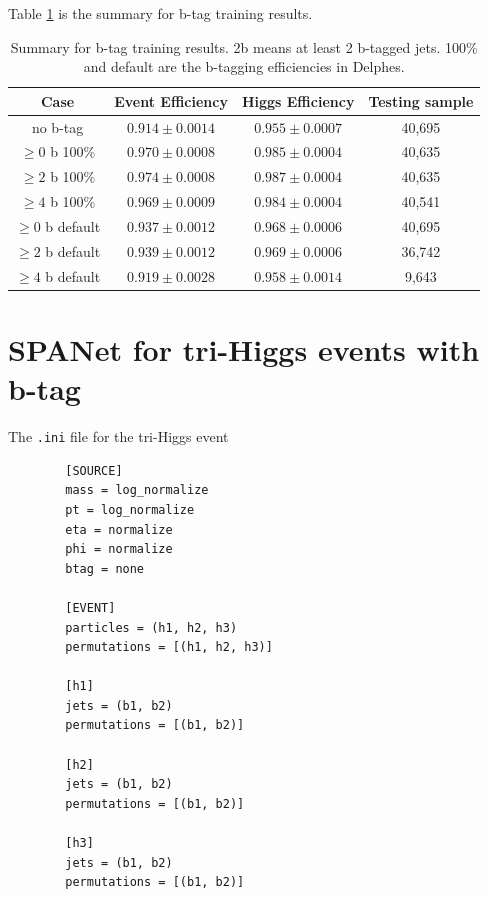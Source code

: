 \documentclass[12pt]{article}
\begin{document}
		Table \ref{tab:comparision_btag_results} is the summary for b-tag training results.
		\begin{table}[htpb]
			\centering
			\caption{Summary for b-tag training results. 2b means at least 2 b-tagged jets. 100\% and default are the b-tagging efficiencies in Delphes.}
			\label{tab:comparision_btag_results}
			\begin{tabular}{c|cc|c}
				Case & Event Efficiency & Higgs Efficiency & Testing sample \\
				\hline
				no b-tag	         &  $0.914 \pm 0.0014$   &  $0.955 \pm 0.0007$  &  40,695	\\
				$\ge 0$ b 100\%	     &  $0.970 \pm 0.0008$   &  $0.985 \pm 0.0004$  &  40,635	\\
				$\ge 2$ b 100\%	     &  $0.974 \pm 0.0008$   &  $0.987 \pm 0.0004$  &  40,635	\\
				$\ge 4$ b 100\%	     &  $0.969 \pm 0.0009$   &  $0.984 \pm 0.0004$  &  40,541	\\
				$\ge 0$ b default	 &  $0.937 \pm 0.0012$   &  $0.968 \pm 0.0006$  &  40,695	\\
				$\ge 2$ b default	 &  $0.939 \pm 0.0012$   &  $0.969 \pm 0.0006$  &  36,742	\\
				$\ge 4$ b default	 &  $0.919 \pm 0.0028$   &  $0.958 \pm 0.0014$  &  9,643	\\
			\end{tabular}
		\end{table}



\section{SPANet for tri-Higgs events with b-tag}%
\label{sec:spanet_for_tri_higgs_events_with_b_tag}
	The \verb+.ini+ file for the tri-Higgs event
	\begin{verbatim}
		[SOURCE]
		mass = log_normalize
		pt = log_normalize
		eta = normalize
		phi = normalize
		btag = none

		[EVENT]
		particles = (h1, h2, h3)
		permutations = [(h1, h2, h3)]

		[h1]
		jets = (b1, b2)
		permutations = [(b1, b2)]

		[h2]
		jets = (b1, b2)
		permutations = [(b1, b2)]

		[h3]
		jets = (b1, b2)
		permutations = [(b1, b2)]		
	\end{verbatim}
\end{document}
